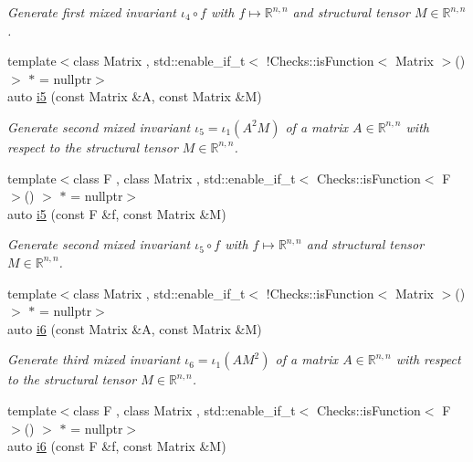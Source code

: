 \begin{DoxyCompactItemize}
\begin{DoxyCompactList}\small\item\em Generate first mixed invariant $ \iota_4\circ f $ with $f\mapsto\mathbb{R}^{n,n}$ and structural tensor $M\in\mathbb{R}^{n,n}$. \end{DoxyCompactList}\item 
{\footnotesize template$<$class Matrix , std\-::enable\-\_\-if\-\_\-t$<$ !\-Checks\-::is\-Function$<$ Matrix $>$() $>$ $\ast$  = nullptr$>$ }\\auto \hyperlink{group__InvariantGroup_gabedc42182203d883278e29fd16b355a0}{i5} (const Matrix \&A, const Matrix \&M)
\begin{DoxyCompactList}\small\item\em Generate second mixed invariant $ \iota_5=\iota_1(A^2M) $ of a matrix $A\in\mathbb{R}^{n,n}$ with respect to the structural tensor $M\in\mathbb{R}^{n,n}$. \end{DoxyCompactList}\item 
{\footnotesize template$<$class F , class Matrix , std\-::enable\-\_\-if\-\_\-t$<$ Checks\-::is\-Function$<$ F $>$() $>$ $\ast$  = nullptr$>$ }\\auto \hyperlink{group__InvariantGroup_gaed7e47c39d89f2b01e25c992da78b44d}{i5} (const F \&f, const Matrix \&M)
\begin{DoxyCompactList}\small\item\em Generate second mixed invariant $ \iota_5\circ f $ with $f\mapsto\mathbb{R}^{n,n}$ and structural tensor $M\in\mathbb{R}^{n,n}$. \end{DoxyCompactList}\item 
{\footnotesize template$<$class Matrix , std\-::enable\-\_\-if\-\_\-t$<$ !\-Checks\-::is\-Function$<$ Matrix $>$() $>$ $\ast$  = nullptr$>$ }\\auto \hyperlink{group__InvariantGroup_gad9f0627946667bb052212f65ecdd002b}{i6} (const Matrix \&A, const Matrix \&M)
\begin{DoxyCompactList}\small\item\em Generate third mixed invariant $ \iota_6=\iota_1(AM^2) $ of a matrix $A\in\mathbb{R}^{n,n}$ with respect to the structural tensor $M\in\mathbb{R}^{n,n}$. \end{DoxyCompactList}\item 
{\footnotesize template$<$class F , class Matrix , std\-::enable\-\_\-if\-\_\-t$<$ Checks\-::is\-Function$<$ F $>$() $>$ $\ast$  = nullptr$>$ }\\auto \hyperlink{group__InvariantGroup_ga2536c80df733bb3e089487202c3688c1}{i6} (const F \&f, const Matrix \&M)

\end{DoxyCompactItemize}

